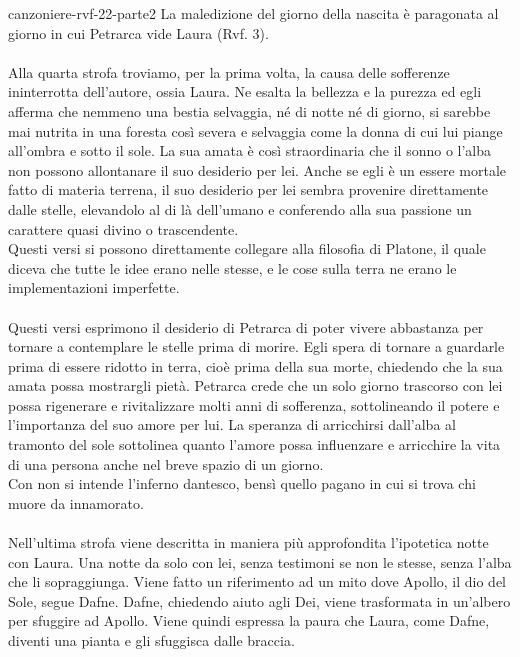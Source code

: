 \documentclass[preview]{standalone}
\begin{document}
\begin{snippet}{canzoniere-rvf-22-parte2}
    La maledizione del giorno della nascita è paragonata al giorno in cui Petrarca vide Laura (Rvf. 3).
    \\\\
     Alla quarta strofa troviamo, per la prima volta, la causa delle sofferenze ininterrotta dell'autore,
    ossia Laura. Ne esalta la bellezza e la purezza ed egli afferma che nemmeno una bestia selvaggia,
    né di notte né di giorno, si sarebbe mai nutrita in una foresta così severa
    e selvaggia come la donna di cui lui piange all'ombra e sotto il sole.
    La sua amata è così straordinaria che il sonno o
    l'alba non possono allontanare il suo desiderio per lei.
    Anche se egli è un essere mortale fatto di materia terrena,
    il suo desiderio per lei sembra provenire direttamente dalle stelle,
    elevandolo al di là dell'umano e conferendo alla sua passione un carattere
    quasi divino o trascendente. \\
    Questi versi si possono direttamente collegare alla filosofia di Platone, il quale
    diceva che tutte le idee erano nelle stesse, e le cose sulla terra ne erano le implementazioni
    imperfette.
    \\\\
     Questi versi esprimono il desiderio di Petrarca di poter vivere abbastanza
    per tornare a contemplare le stelle prima di morire.
    Egli spera di tornare a guardarle prima di essere ridotto in terra,
    cioè prima della sua morte, chiedendo che la sua amata possa mostrargli pietà.
    Petrarca crede che un solo giorno trascorso con lei possa rigenerare e rivitalizzare
    molti anni di sofferenza, sottolineando il potere e l'importanza del suo amore per lui.
    La speranza di arricchirsi dall'alba al tramonto del sole sottolinea quanto l'amore possa
    influenzare e arricchire la vita di una persona anche nel breve spazio di un giorno. \\
    Con  non si intende l'inferno dantesco, bensì quello pagano in cui
    si trova chi muore da innamorato.
    \\\\
     Nell'ultima strofa viene descritta in maniera più approfondita l'ipotetica notte con Laura.
    Una notte da solo con lei, senza testimoni se non le stesse, senza l'alba che li sopraggiunga.
    Viene fatto un riferimento ad un mito dove Apollo, il dio del Sole, segue Dafne.
    Dafne, chiedendo aiuto agli Dei, viene trasformata in un'albero per sfuggire ad Apollo.
    Viene quindi espressa la paura che Laura, come Dafne, diventi una pianta e gli sfuggisca dalle braccia.

\end{snippet}
\end{document}
